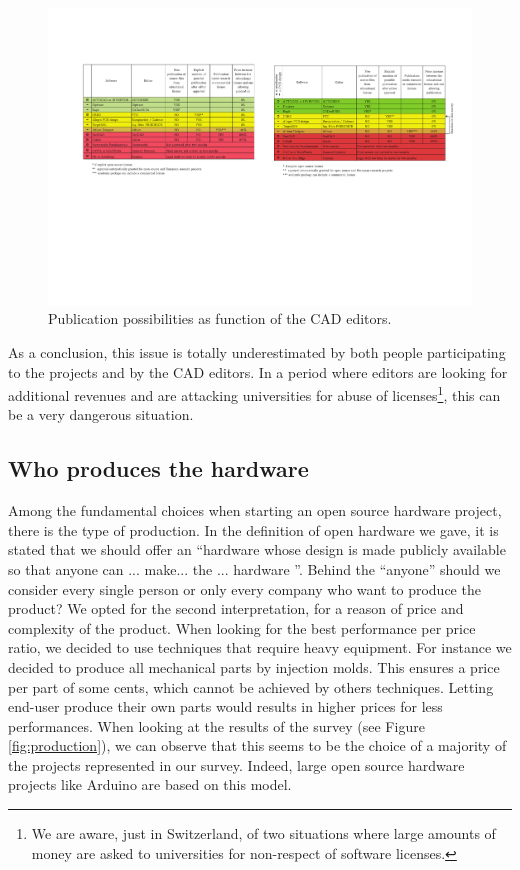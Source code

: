 \documentclass[letterpaper, 10 pt, conference]{ieeeconf}  %
\begin{document}
\begin{figure}
\centering
\includegraphics[width=\columnwidth]{figures/table}
\caption{Publication possibilities as function of the CAD editors.}
\label{fig:editors}
\end{figure}

As a conclusion, this issue is totally underestimated by both people participating to the projects and by the CAD editors. 
In a period where editors are looking for additional revenues and are attacking universities for abuse of licenses\footnote{We are aware, just in Switzerland, of two situations where large amounts of money are asked to universities for non-respect of software licenses.}, this can be a very dangerous situation.

\subsection{Who produces the hardware}

Among the fundamental choices when starting an open source hardware project, there is the type of production. 
In the definition of open hardware we gave, it is stated that we should offer an ``hardware whose design is made publicly available so that anyone can ... make... the ... hardware ''.
Behind the ``anyone'' should we consider every single person or only every company who want to produce the product?
We opted for the second interpretation, for a reason of price and complexity of the product. 
When looking for the best performance per price ratio, we decided to use techniques that require heavy equipment.
For instance we decided to produce all mechanical parts by injection molds. 
This ensures a price per part of some cents, which cannot be achieved by others techniques.
Letting end-user produce their own parts would results in higher prices for less performances. 
When looking at the results of the survey (see Figure \ref{fig:production}), we can observe that this seems to be the choice of a majority of the projects represented in our survey.
Indeed, large open source hardware projects like Arduino are based on this model.
\end{document}
